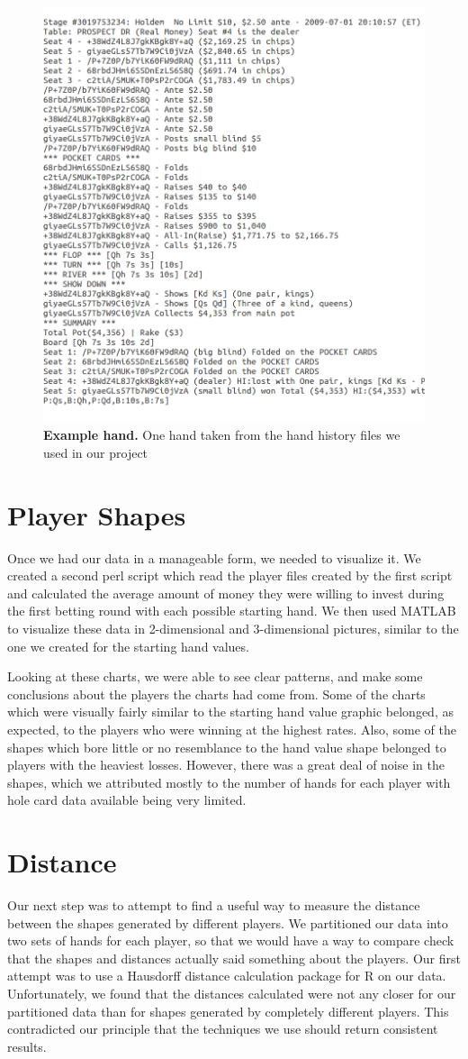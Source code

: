 \documentclass[11pt]{article}
\begin{document}
\begin{figure}[ht!]
		\includegraphics[width=.45\textwidth]{hand}
  		\caption{\textbf{Example hand.} One hand taken from the hand history files
  		we used in our project}
\end{figure}

\section*{Player Shapes}
Once we had our data in a manageable form, we needed to visualize it. We created
a second perl script which read the player files created by the first script and 
calculated the average amount of money they were willing to invest during the
first betting round with each possible starting hand. We then used MATLAB to
visualize these data in 2-dimensional and 3-dimensional pictures, similar to the
one we created for the starting hand values.

Looking at these charts, we were able to see clear patterns, and make some
conclusions about the players the charts had come from. Some of the charts which
were visually fairly similar to the starting hand value graphic belonged, as
expected, to the players who were winning at the highest rates. Also,
some of the shapes which bore little or no resemblance to the hand value shape
belonged to players with the heaviest losses. However, there was a great deal
of noise in the shapes, which we attributed mostly to the number of hands for each
player with hole card data available being very limited.

\section*{Distance}
Our next step was to attempt to find a useful way to measure the distance
between the shapes generated by different players. We partitioned our data into
two sets of hands for each player, so that we would have a way to compare check
that the shapes and distances actually said something about the players. Our
first attempt was to use a Hausdorff distance calculation package for R on our 
data. Unfortunately, we found that the distances calculated were not any closer
for our partitioned data than for shapes generated by completely different players.
This contradicted our principle that the techniques we use should return consistent
results.
\end{document}
